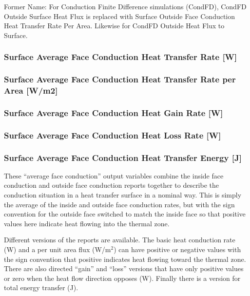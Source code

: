 Former Name: For Conduction Finite Difference simulations (CondFD), CondFD Outside Surface Heat Flux is replaced with Surface Outside Face Conduction Heat Transfer Rate Per Area. Likewise for CondFD Outside Heat Flux to Surface.

\subsubsection{Surface Average Face Conduction Heat Transfer Rate {[}W{]}}\label{surface-average-face-conduction-heat-transfer-rate-w}

\subsubsection{Surface Average Face Conduction Heat Transfer Rate per Area {[}W/m2{]}}\label{surface-average-face-conduction-heat-transfer-rate-per-area-wm2}

\subsubsection{Surface Average Face Conduction Heat Gain Rate {[}W{]}}\label{surface-average-face-conduction-heat-gain-rate-w}

\subsubsection{Surface Average Face Conduction Heat Loss Rate {[}W{]}}\label{surface-average-face-conduction-heat-loss-rate-w}

\subsubsection{Surface Average Face Conduction Heat Transfer Energy {[}J{]}}\label{surface-average-face-conduction-heat-transfer-energy-j}

These ``average face conduction'' output variables combine the inside face conduction and outside face conduction reports together to describe the conduction situation in a heat transfer surface in a nominal way. This is simply the average of the inside and outside face conduction rates, but with the sign convention for the outside face switched to match the inside face so that positive values here indicate heat flowing into the thermal zone.

Different versions of the reports are available. The basic heat conduction rate (W) and a per unit area flux (W/m\(^{2}\)) can have positive or negative values with the sign convention that positive indicates heat flowing toward the thermal zone. There are also directed ``gain'' and ``loss'' versions that have only positive values or zero when the heat flow direction opposes (W). Finally there is a version for total energy transfer (J).

